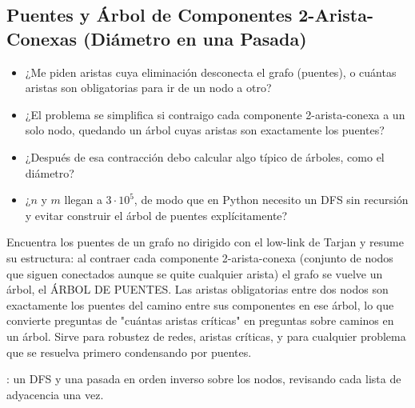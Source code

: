 \subsection{Puentes y Árbol de Componentes 2-Arista-Conexas (Diámetro en una Pasada)}
\label{alg:4-14}


\begin{itemize}
\item ¿Me piden aristas cuya eliminación desconecta el grafo (puentes), o cuántas aristas son obligatorias para ir de un nodo a otro?
\item ¿El problema se simplifica si contraigo cada componente 2-arista-conexa a un solo nodo, quedando un árbol cuyas aristas son exactamente los puentes?
\item ¿Después de esa contracción debo calcular algo típico de árboles, como el diámetro?
\item ¿$n$ y $m$ llegan a $3\cdot10^5$, de modo que en Python necesito un DFS sin recursión y evitar construir el árbol de puentes explícitamente?
\end{itemize}

 Encuentra los puentes de un grafo no dirigido con el low-link de Tarjan y resume su estructura: al contraer cada componente 2-arista-conexa (conjunto de nodos que siguen conectados aunque se quite cualquier arista) el grafo se vuelve un árbol, el ÁRBOL DE PUENTES. Las aristas obligatorias entre dos nodos son exactamente los puentes del camino entre sus componentes en ese árbol, lo que convierte preguntas de "cuántas aristas críticas" en preguntas sobre caminos en un árbol. Sirve para robustez de redes, aristas críticas, y para cualquier problema que se resuelva primero condensando por puentes.

 : un DFS y una pasada en orden inverso sobre los nodos, revisando cada lista de adyacencia una vez.

